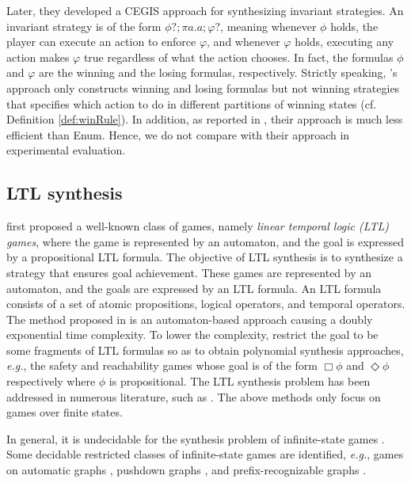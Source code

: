 \documentclass[review]{elsarticle}
\newcommand\eg{{\it e.g.}}
\begin{document}
Later, they \cite{LuoL2022} developed a CEGIS approach for synthesizing invariant strategies.
An invariant strategy is of the form $\phi?; \pi a. a; \varphi?$, meaning whenever $\phi$ holds, the player can execute an action to enforce $\varphi$, and whenever $\varphi$ holds, executing any action makes $\varphi$ true regardless of what the action chooses.
In fact, the formulas $\phi$ and $\varphi$ are the winning and the losing formulas, respectively.
Strictly speaking, \citet{LuoL2022}'s approach only constructs winning and losing formulas but not winning strategies that specifies which action to do in different partitions of winning states (cf. Definition \ref{def:winRule}).
In addition, as reported in \cite{LuoL2022}, their approach is much less efficient than Enum.
Hence, we do not compare with their approach in experimental evaluation.


\subsection{LTL synthesis}
\citet{PnuR1989} first proposed a well-known class of games, namely \textit{linear temporal logic (LTL) games}, where the game is represented by an automaton, and the goal is expressed by a propositional LTL formula.
The objective of LTL synthesis is to synthesize a strategy that ensures goal achievement.
These games	are represented by an automaton, and the goals are expressed by an LTL formula. An LTL formula consists of a set of atomic propositions, logical operators, and temporal operators.
The method proposed in \cite{PnuR1989} is an automaton-based approach causing a doubly exponential time complexity.
To lower the complexity, \citet{AsaMPS1998} restrict the goal to be some fragments of LTL formulas so as to obtain polynomial synthesis approaches, \eg, the safety and reachability games whose goal is of the form $\Box \phi$ and $\Diamond \phi$ respectively where $\phi$ is propositional. The LTL synthesis problem has been addressed in numerous literature, such as \cite{NikAN2015,ZhuTLPV2017,CamMBM2018,GiaFLVX2022,BalFR2023,KreMPR2023}.
The above methods only focus on games over finite states. 

In general, it is undecidable for the synthesis problem of infinite-state games \cite{AlfHM2001}.
Some decidable restricted classes of infinite-state games are identified, \eg, games on automatic graphs \cite{NeiT2016}, pushdown graphs \cite{Cac2002,ChaF2013}, and prefix-recognizable graphs \cite{Cac2003}.
\end{document}
